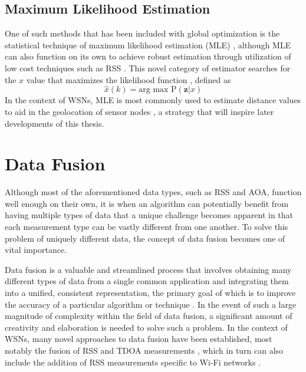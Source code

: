 \documentclass[12pt]{uthesis-v12}  %
\begin{document}
\subsection{Maximum Likelihood Estimation}

One of such methods that has been included with global optimization is the statistical technique of maximum likelihood estimation (MLE) \cite{ding}, although MLE can also function on its own to achieve robust estimation through utilization of low cost techniques such as RSS \cite{dapeng}. This novel category of estimator searches for the $x$ value that maximizes the likelihood function \cite{nakamura}, defined as
\begin{equation}
\hat{x}(k)=\text{arg max P}(\textbf{z}|x)
\label{mle}
\end{equation}
In the context of WSNs, MLE is most commonly used to estimate distance values to aid in the geolocation of sensor nodes \cite{nakamura}, a strategy that will inspire later developments of this thesis.

\section{Data Fusion} 

Although most of the aforementioned data types, such as RSS and AOA, function well enough on their own, it is when an algorithm can potentially benefit from having multiple types of data that a unique challenge becomes apparent in that each measurement type can be vastly different from one another. To solve this problem of uniquely different data, the concept of data fusion becomes one of vital importance.

Data fusion is a valuable and streamlined process that involves obtaining many different types of data from a single common application and integrating them into a unified, consistent representation, the primary goal of which is to improve the accuracy of a particular algorithm or technique \cite{wang}. In the event of such a large magnitude of complexity within the field of data fusion, a significant amount of creativity and elaboration is needed to solve such a problem. In the context of WSNs, many novel approaches to data fusion have been established, most notably the fusion of RSS and TDOA measurements \cite{hatami}, which in turn can also include the addition of RSS measurements specific to Wi-Fi networks \cite{kumarasiri1}.
\end{document}
